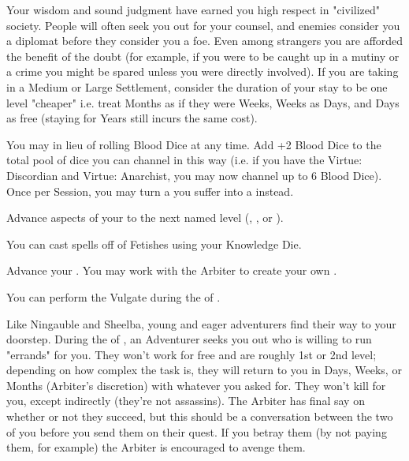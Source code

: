 \begin{multicols*}{2}
Your wisdom and sound judgment have earned you high respect in "civilized" society. People will often seek you out for your counsel, and enemies consider you a diplomat before they consider you a foe. Even among strangers you are afforded the benefit of the doubt (for example, if you were to be caught up in a mutiny or a crime you might be spared unless you were directly involved). If you are taking  in a Medium or Large Settlement, consider the duration of your stay to be one level "cheaper" i.e. treat Months as if they were Weeks, Weeks as Days, and Days as free (staying for Years still incurs the same cost).


You may  in lieu of rolling Blood Dice at any time. Add +2 Blood Dice to the total pool of dice you can channel in this way (i.e. if you have the Virtue: Discordian and Virtue: Anarchist, you may now channel up to 6 Blood Dice). Once per Session, you may turn a  you suffer into a  instead.

\cbreak


Advance  aspects of your  to the next named level (\DEATH, \INJURY, or \INSANITY).


You can cast spells off of Fetishes using your Knowledge Die.


Advance your  \DCUP. You may work with the Arbiter to create your own .



You can perform the  Vulgate during the  of . 


Like Ningauble and Sheelba, young and eager adventurers find their way to your doorstep. During the  of , an Adventurer seeks you out who is willing to run "errands" for you. They won't work for free and are roughly 1st or 2nd level; depending on how complex the task is, they will return to you in Days, Weeks, or Months (Arbiter's discretion) with whatever you asked for. They won't kill for you, except indirectly (they're not assassins). The Arbiter has final say on whether or not they succeed, but this should be a conversation between the two of you before you send them on their quest. If you betray them (by not paying them, for example) the Arbiter is encouraged to avenge them.


\end{multicols*}
